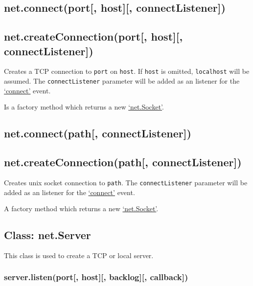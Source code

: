 \subsection{net.connect(port{[}, host{]}{[},
connectListener{]})}\label{net.connectport-host-connectlistener}

\subsection{net.createConnection(port{[}, host{]}{[},
connectListener{]})}\label{net.createconnectionport-host-connectlistener}

Creates a TCP connection to \texttt{port} on \texttt{host}. If
\texttt{host} is omitted,
\texttt{\textquotesingle{}localhost\textquotesingle{}} will be assumed.
The \texttt{connectListener} parameter will be added as an listener for
the \hyperref[netux5feventux5fconnect]{`connect'} event.

Is a factory method which returns a new
\hyperref[netux5fclassux5fnetux5fsocket]{`net.Socket'}.

\subsection{net.connect(path{[},
connectListener{]})}\label{net.connectpath-connectlistener}

\subsection{net.createConnection(path{[},
connectListener{]})}\label{net.createconnectionpath-connectlistener}

Creates unix socket connection to \texttt{path}. The
\texttt{connectListener} parameter will be added as an listener for the
\hyperref[netux5feventux5fconnect]{`connect'} event.

A factory method which returns a new
\hyperref[netux5fclassux5fnetux5fsocket]{`net.Socket'}.

\subsection{Class: net.Server}\label{class-net.server}

This class is used to create a TCP or local server.

\subsubsection{server.listen(port{[}, host{]}{[}, backlog{]}{[},
callback{]})}\label{server.listenport-host-backlog-callback}

